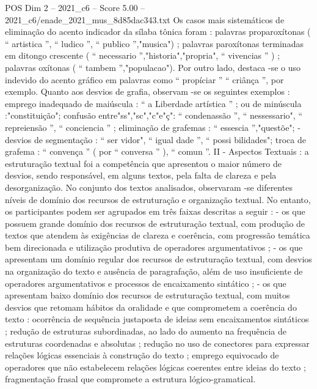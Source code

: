 \begin{textsample}{POS Dim 2 – 2021\_c6 – Score 5.00 – 2021\_c6/enade\_2021\_mus\_8d85dac343.txt}
Os casos mais sistemáticos de eliminação do acento indicador da sílaba tônica foram : palavras proparoxítonas ( “ artistica ”, “ ludico ”, “ publico ”,"musica") ; palavras paroxítonas terminadas em ditongo crescente ( “ necessario ”,"historia","propria", “ vivencias ” ) ; palavras oxítonas ( “ tambem ”,"populacao").
Por outro lado, destaca -se o uso indevido do acento gráfico em palavras como “ propíciar ” “ criânça ”, por exemplo.
Quanto aos desvios de grafia, observam -se os seguintes exemplos : emprego inadequado de maiúscula : “ a Liberdade artística ” ; ou de minúscula :"constituição"; confusão entre"ss","sc","c"e"ç": “ condenassão ”, “ nessessario", “ repreiensão ”, “ conciencia ” ; eliminação de grafemas : “ essescia ”,"questõe"; - desvios de segmentação : “ ser vidor", “ igual dade ”, “ possi bilidades"; troca de grafema : “ convença ” ( por “ conversa ” ), “ comun ”.
II - Aspectos Textuais : a estruturação textual foi a competência que apresentou o maior número de desvios, sendo responsável, em alguns textos, pela falta de clareza e pela desorganização.
No conjunto dos textos analisados, observaram -se diferentes níveis de domínio dos recursos de estruturação e organização textual.
No entanto, os participantes podem ser agrupados em três faixas descritas a seguir : - os que possuem grande domínio dos recursos de estruturação textual, com produção de textos que atendem às exigências de clareza e coerência, com progressão temática bem direcionada e utilização produtiva de operadores argumentativos ; - os que apresentam um domínio regular dos recursos de estruturação textual, com desvios na organização do texto e ausência de paragrafação, além de uso insuficiente de operadores argumentativos e processos de encaixamento sintático ; - os que apresentam baixo domínio dos recursos de estruturação textual, com muitos desvios que retomam hábitos da oralidade e que comprometem a coerência do texto : ocorrência de sequência justaposta de ideias sem encaixamentos sintáticos ; redução de estruturas subordinadas, ao lado do aumento na frequência de estruturas coordenadas e absolutas ; redução no uso de conectores para expressar relações lógicas essenciais à construção do texto ; emprego equivocado de operadores que não estabelecem relações lógicas coerentes entre ideias do texto ; fragmentação frasal que compromete a estrutura lógico-gramatical.

\end{textsample}
